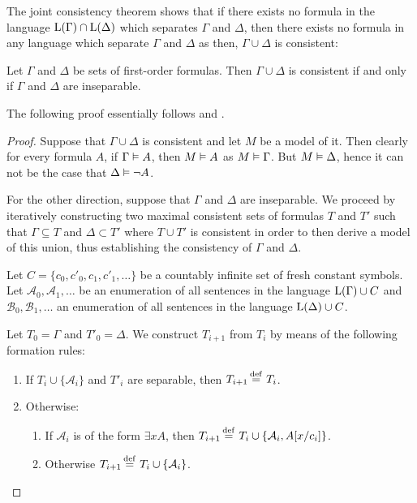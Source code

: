 The joint consistency theorem shows that if there exists no formula in the language $\operatorname{L}(\Gamma)\cap \operatorname{L}(\Delta)$ which separates $\Gamma$ and $\Delta$, then there exists no formula in any language which separate $\Gamma$ and $\Delta$ as then, $\Gamma \cup \Delta$ is consistent:

\begin{thm}
	\label{thm:robinson}
	Let $\Gamma$ and $\Delta$ be sets of first-order formulas.
	Then $\Gamma \cup \Delta$ is consistent if and only if $\Gamma$ and $\Delta$ are inseparable.
\end{thm}
The following proof essentially follows \cite{Henkin63} and \cite{chang1990model}.
\begin{proof}
	Suppose that $\Gamma\cup\Delta$ is consistent and let $M$ be a model of it.
	Then clearly for every formula $A$, if $\Gamma \vDash A$, then $M \vDash A$ as $M \vDash \Gamma$.
	But $M \vDash \Delta$, hence it can not be the case that $\Delta \vDash \lnot A$.

	For the other direction, suppose that $\Gamma$ and $\Delta$ are inseparable.
	We proceed by iteratively constructing two maximal consistent sets of formulas $T$ and $T'$ such that $\Gamma \subseteq T$ and $\Delta \subset T'$ where $T \cup T'$ is consistent in order to then derive a model of this union, thus establishing the consistency of $\Gamma$ and $\Delta$.

	Let $C = \{c_0, c'_0, c_1, c'_1, \dots\}$ be
	a countably infinite set of fresh constant symbols.
	Let $\mathcal{A}_0, \mathcal{A}_1, \dots$ be an enumeration of all sentences in the language $\operatorname{L}(\Gamma) \cup C$
	and $\mathcal{B}_0, \mathcal{B}_1, \dots$ an enumeration of all sentences in the language $\operatorname{L}(\Delta) \cup C$.

	Let $T_0 = \Gamma$ and $T'_0 = \Delta$. 
	We construct
	$T_{i+1}$ 
	from
	$T_{i}$
	by means of the following formation rules:
	\begin{enumerate}[~~(1)]
		\item
			\label{theory_construction_1}
			If $T_{i} \cup \{\mathcal{A}_i\}$ and $T'_{i}$ are separable, then $T_{i+1} \defeq{}\, T_i$.
		\item Otherwise:
			\label{theory_construction_2}
			\begin{enumerate}[(2a)]
				\item If $\mathcal{A}_i$ is of the form $\exists x A$, then $T_{i+1} \defeq{}\, T_i \cup \{ \mathcal{A}_i, A\subst{x/c_i} \}$.
			\label{theory_construction_2a}
				\item Otherwise $T_{i+1} \defeq{}\, T_i \cup \{ \mathcal{A}_i \}$.
			\label{theory_construction_2b}
			\end{enumerate}
	\end{enumerate}


\end{proof}

